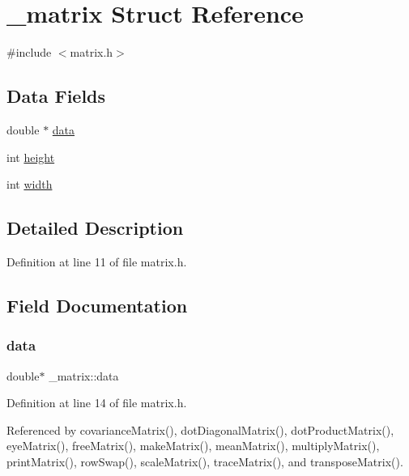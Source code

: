 \hypertarget{struct__matrix}{}\section{\+\_\+matrix Struct Reference}
\label{struct__matrix}


{\ttfamily \#include $<$matrix.\+h$>$}

\subsection*{Data Fields}
\begin{DoxyCompactItemize}
\item 
double $\ast$ \hyperlink{struct__matrix_ad3fdadaa9e22623d5830e37663d500be}{data}
\item 
int \hyperlink{struct__matrix_a8d3b2dbcf98704f11073d646273eb3b0}{height}
\item 
int \hyperlink{struct__matrix_a30d055d00e1b4afea4568f2aa1cf5c37}{width}
\end{DoxyCompactItemize}


\subsection{Detailed Description}


Definition at line 11 of file matrix.\+h.



\subsection{Field Documentation}
\mbox{\label{struct__matrix_ad3fdadaa9e22623d5830e37663d500be}} 
\subsubsection{\texorpdfstring{data}{data}}
{\footnotesize\ttfamily double$\ast$ \+\_\+matrix\+::data}



Definition at line 14 of file matrix.\+h.



Referenced by covariance\+Matrix(), dot\+Diagonal\+Matrix(), dot\+Product\+Matrix(), eye\+Matrix(), free\+Matrix(), make\+Matrix(), mean\+Matrix(), multiply\+Matrix(), print\+Matrix(), row\+Swap(), scale\+Matrix(), trace\+Matrix(), and transpose\+Matrix().


